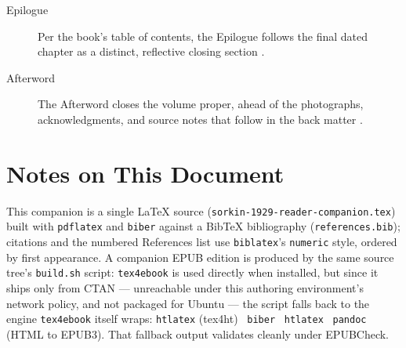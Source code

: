 \documentclass[11pt]{article}
\begin{document}
\begin{description}
\item[Epilogue] Per the book's table of contents, the Epilogue follows the
final dated chapter as a distinct, reflective closing section
\autocite{vitalsource1929}.
\item[Afterword] The Afterword closes the volume proper, ahead of the
photographs, acknowledgments, and source notes that follow in the back matter
\autocite{vitalsource1929}.
\end{description}

\section{Notes on This Document}
\label{sec:notes}

This companion is a single LaTeX source (\texttt{sorkin-1929-reader-companion.tex})
built with \texttt{pdflatex} and \texttt{biber} against a BibTeX bibliography
(\texttt{references.bib}); citations and the numbered References list use
\texttt{biblatex}'s \texttt{numeric} style, ordered by first appearance. A
companion EPUB edition is produced by the same source tree's \texttt{build.sh}
script: \texttt{tex4ebook} is used directly when installed, but since it ships
only from CTAN --- unreachable under this authoring environment's network
policy, and not packaged for Ubuntu --- the script falls back to the engine
\texttt{tex4ebook} itself wraps: \texttt{htlatex} (tex4ht) \textrightarrow\
\texttt{biber} \textrightarrow\ \texttt{htlatex} \textrightarrow\ \texttt{pandoc}
(HTML to EPUB3). That fallback output validates cleanly under EPUBCheck.
\end{document}

